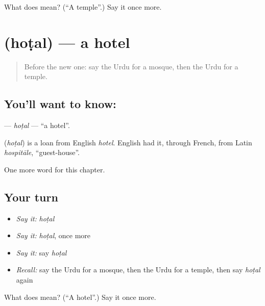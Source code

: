 \begin{tcolorbox}[breakable,colback=teal!4,colframe=teal!35!black,title={Before you move on}]
What does  mean? (\textquotedblleft{}A temple\textquotedblright{}.) Say it once more.
\end{tcolorbox}
\section[\texorpdfstring{\ur{ہوٹل} (hoṭal)}{ہوٹل (hoṭal)}]{ (hoṭal) — a hotel}

\label{lesson:UR-C81-hotal}



\begin{quote}
Before the new one: say the Urdu for a mosque, then the Urdu for a temple.
\end{quote}

\subsection*{You'll want to know: }
\textbf{} — \emph{hoṭal} — \textquotedblleft{}a hotel\textquotedblright{}.

\begin{cousinweb}
\textbf{} (\emph{hoṭal}) is a loan from English \emph{hotel}. English had it, through French, from Latin \emph{hospitāle}, \textquotedblleft{}guest-house\textquotedblright{}.
\end{cousinweb}

\begin{grammarlens}[title={What you've built}]
One more word for this chapter.
\end{grammarlens}

\subsection*{Your turn}
\begin{itemize}
\raggedright
  \item \emph{Say it:} \emph{hoṭal}
  \item \emph{Say it:} \emph{hoṭal}, once more
  \item \emph{Say it:} say \emph{hoṭal}
  \item \emph{Recall:} say the Urdu for a mosque, then the Urdu for a temple, then say \emph{hoṭal} again
\end{itemize}

\begin{tcolorbox}[breakable,colback=teal!4,colframe=teal!35!black,title={Before you move on}]
What does  mean? (\textquotedblleft{}A hotel\textquotedblright{}.) Say it once more.
\end{tcolorbox}
